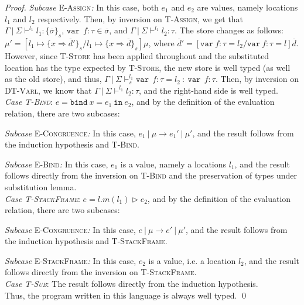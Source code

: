 \documentclass{llncs}
\newcommand{\keywadj}[1]{\mathtt{#1}}
\newcommand{\keyw}[1]{\keywadj{#1}~}
\begin{document}
\begin{proof}
\textit{Subcase} \textsc{E-Assign}\textit{:} In this case, both $e_1$ and $e_2$ are values, namely locations $l_1$ and $l_2$ respectively. Then, by inversion on \textsc{T-Assign}, we get that $\Gamma~|~\Sigma \vdash^{l_1} l_1 : \{ \overline{\sigma} \}_s$, $\keyw{var}~ f : \tau \in \overline{\sigma}$, and $\Gamma~|~\Sigma \vdash^{l_1} l_2 : \tau$. The store changes as follows: $\mu' = [l_1 \mapsto \{ x \Rightarrow \overline{d}' \}_{s}/l_1 \mapsto \{ x \Rightarrow \overline{d} \}_{s}]\mu$, where $\overline{d}' = [\keyw{var} f:\tau = l_2/\keyw{var} f : \tau = l]\overline{d}$. However, since \textsc{T-Store} has been applied throughout and the substituted location has the type expected by \textsc{T-Store}, the new store is well typed (as well as the old store), and thus, \mbox{$\Gamma~|~\Sigma \vdash^{l_1}_s \keyw{var}~ f : \tau = l_2~:~\keyw{var}~ f : \tau$}. Then, by inversion on \textsc{DT-Varl}, we know that $\Gamma~|~\Sigma \vdash^{l_1} l_2 : \tau$, and the right-hand side is well typed.
\\

\noindent\textit{Case \textsc{T-Bind}}:
$e = \keyw{bind} x = e_1~\keyw{in} e_2$, and by the definition of the evaluation relation, there are two subcases:

\textit{Subcase} \textsc{E-Congruence}\textit{:} In this case, $e_1~|~\mu \longrightarrow e_1'~|~\mu'$, and the result follows from the induction hypothesis and \textsc{T-Bind}.

\textit{Subcase} \textsc{E-Bind}\textit{:} In this case, $e_1$ is a value, namely a locations $l_1$, and the result follows directly from the inversion on \textsc{T-Bind} and the preservation of types under substitution lemma.
\\

\noindent\textit{Case \textsc{T-StackFrame}}:
$e = l.m(l_1) \rhd e_2$, and by the definition of the evaluation relation, there are two subcases:

\textit{Subcase} \textsc{E-Congruence}\textit{:} In this case, $e~|~\mu \longrightarrow e'~|~\mu'$, and the result follows from the induction hypothesis and \textsc{T-StackFrame}.

\textit{Subcase} \textsc{E-StackFrame}\textit{:} In this case, $e_2$ is a value, i.e. a location $l_2$, and the result follows directly from the inversion on \textsc{T-StackFrame}.
\\

\noindent\textit{Case \textsc{T-Sub}}:
The result follows directly from the induction hypothesis.
\\

\noindent Thus, the program written in this language is always well typed. \qed

\end{proof}
\end{document}
